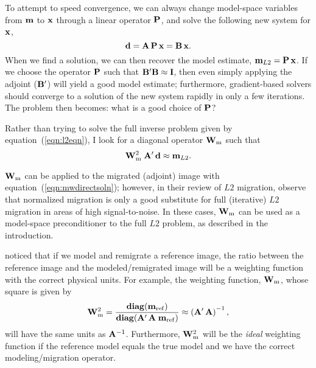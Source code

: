 \par
To attempt to speed convergence, we can always change model-space
variables from ${\bf m}$ to ${\bf x}$ through a linear operator 
${\bf P}$, and solve the following new system for ${\bf x}$, 
\begin{equation}
{\bf d}={\bf A \, P \, x} = {\bf B \, x}.
\end{equation}
When we find a solution, we can then recover the model estimate,  
${\bf m}_{L2}={\bf P} \, {\bf x}$.
If we choose the operator ${\bf P}$ such that ${\bf B}' {\bf B}
\approx {\bf I}$, then even simply applying the adjoint (${\bf B}'$)
will yield a good model estimate; furthermore, gradient-based solvers
should converge to a solution of the new system rapidly in only a few
iterations. The problem then becomes: what is a good choice of 
${\bf P}$?

\par
Rather than trying to solve the full inverse problem given by 
equation~(\ref{eqn:l2eqn}), I look for a diagonal 
operator ${\bf W}_{\rm m}$ such that   
\begin{equation} \label{eqn:mwdirectsoln}
{\bf W}_{\rm m}^{2} \; {\bf A}' \, {\bf d} 
\approx {\bf m}_{L2}.
\end{equation}

\par
${\bf W}_{\rm m}$ can be applied to the migrated (adjoint)
image with equation~(\ref{eqn:mwdirectsoln}); however,
in their review of $L2$ migration,  observe that 
normalized migration is only a good substitute for full (iterative) 
$L2$ migration in areas of high signal-to-noise.  
In these cases, ${\bf W}_{\rm m}$ can be used as a model-space
preconditioner to the full $L2$ problem, as described in 
the introduction.

\par
{} noticed that if we model and remigrate a
reference image, the ratio between the reference image and the
modeled/remigrated image will be a weighting function with the
correct physical units. For example, the weighting function, 
${\bf W}_{\rm m}$, whose square is given by 
\begin{equation} \label{eqn:adjointscaling}
{\bf W}_{\rm m}^{2} = \frac{ {\rm\bf diag} ({\bf m}_{\rm ref}) }
{ {\rm\bf diag} ({\bf A}'\, {\bf A} \; {\bf m}_{\rm ref}) } \approx 
\left( {\bf A}'\, {\bf A}\right)^{-1},
\end{equation}
will have the same units as ${\bf A}^{-1}$.
Furthermore, ${\bf W}_{\rm m}^{2}$ will be the {\em ideal} weighting
function if the reference model equals the true model and we have the
correct modeling/migration operator.

